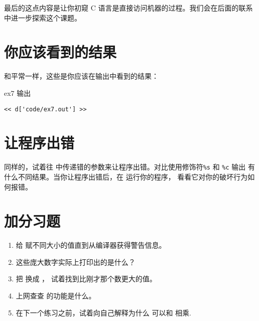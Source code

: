 最后的这点内容是让你初窥 C 语言是直接访问机器的过程。我们会在后面的联系中进一步探索这个课题。

\section{你应该看到的结果}

和平常一样，这些是你应该在输出中看到的结果：

\begin{code}{ex7 输出}
\begin{lstlisting}
<< d['code/ex7.out'] >>
\end{lstlisting}
\end{code}


\section{让程序出错}

同样的，试着往  中传递错的参数来让程序出错。对比使用修饰符\verb|%s| 和 \verb|%c| 输出  有什么不同结果。当你让程序出错后，在  运行你的程序， 看看它对你的破坏行为如何报错。

\section{加分习题}

\begin{enumerate}
\item 给  赋不同大小的值直到从编译器获得警告信息。
\item 这些庞大数字实际上打印出的是什么？
\item 把  换成 ， 试着找到比刚才那个数更大的值。
\item 上网查查  的功能是什么。
\item 在下一个练习之前，试着向自己解释为什么  可以和  相乘.
\end{enumerate}

